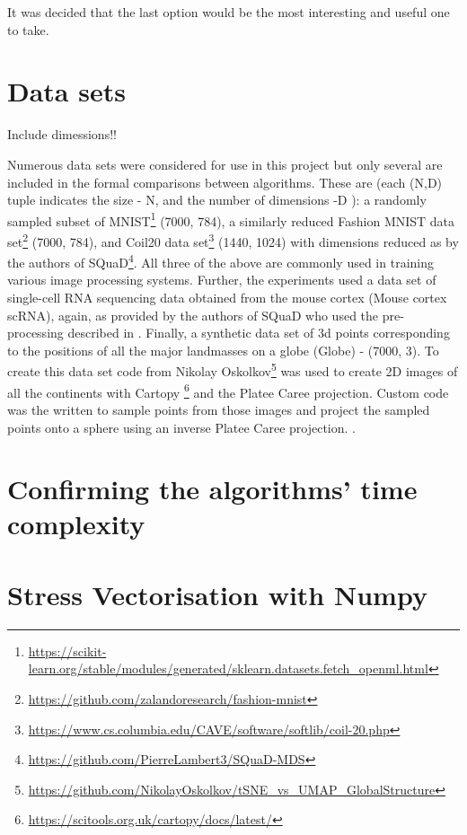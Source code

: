 \documentclass{l4proj}
\begin{document}
It was decided that the last option would be the most interesting and useful one to take.

\section{Data sets}
\label{sec:datasets}

Include dimessions!!

Numerous data sets were considered for use in this project but only several are included in the formal comparisons between algorithms. These are (each (N,D) tuple indicates the size - N, and the number of dimensions -D ): a randomly sampled subset of MNIST\footnote{\url{https://scikit-learn.org/stable/modules/generated/sklearn.datasets.fetch_openml.html}} (7000, 784), a similarly reduced Fashion MNIST data set\footnote{\url{https://github.com/zalandoresearch/fashion-mnist}} (7000, 784), and Coil20 data set\footnote{\url{https://www.cs.columbia.edu/CAVE/software/softlib/coil-20.php}} (1440, 1024) with dimensions reduced as by the authors of SQuaD\footnote{ \url{https://github.com/PierreLambert3/SQuaD-MDS}}. All three of the above are commonly used in training various image processing systems. Further, the experiments used a data set of single-cell RNA sequencing data obtained from the mouse cortex\citet{mouse_cortex} (Mouse cortex scRNA), again, as provided by the authors of SQuaD \citep{squad} who used the pre-processing described in \citet{mouse_cortex_preprocess}. Finally, a synthetic data set of 3d points corresponding to the positions of all the major landmasses on a globe (Globe) - (7000, 3). To create this data set code from Nikolay Oskolkov\footnote{\url{https://github.com/NikolayOskolkov/tSNE_vs_UMAP_GlobalStructure}} was used to create 2D images of all the continents with Cartopy \footnote{\url{https://scitools.org.uk/cartopy/docs/latest/}} and the Platee Caree projection. Custom code was the written to sample points from those images and project the sampled points onto a sphere using an inverse Platee Caree projection. 
 . 


\section{Confirming the algorithms' time complexity}

\section{Stress Vectorisation with Numpy}
\end{document}
